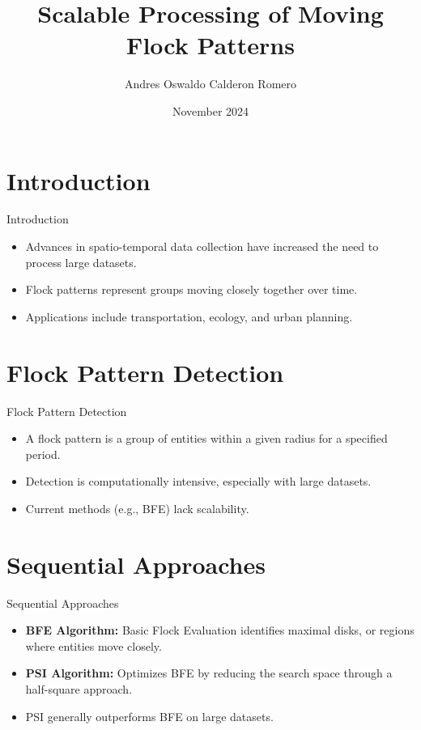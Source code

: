 \documentclass{beamer}
\title{Scalable Processing of Moving Flock Patterns}
\author{Andres Oswaldo Calderon Romero}
\institute{University of California, Riverside}
\date{November 2024}
\begin{document}
\frame{\titlepage}

\section{Introduction}
\begin{frame}{Introduction}
    \begin{itemize}
        \item Advances in spatio-temporal data collection have increased the need to process large datasets.
        \item Flock patterns represent groups moving closely together over time.
        \item Applications include transportation, ecology, and urban planning.
    \end{itemize}
\end{frame}

\section{Flock Pattern Detection}
\begin{frame}{Flock Pattern Detection}
    \begin{itemize}
        \item A flock pattern is a group of entities within a given radius for a specified period.
        \item Detection is computationally intensive, especially with large datasets.
        \item Current methods (e.g., BFE) lack scalability.
    \end{itemize}
\end{frame}

\section{Sequential Approaches}
\begin{frame}{Sequential Approaches}
    \begin{itemize}
        \item \textbf{BFE Algorithm:} Basic Flock Evaluation identifies maximal disks, or regions where entities move closely.
        \item \textbf{PSI Algorithm:} Optimizes BFE by reducing the search space through a half-square approach.
        \item PSI generally outperforms BFE on large datasets.
    \end{itemize}
\end{frame}
\end{document}
